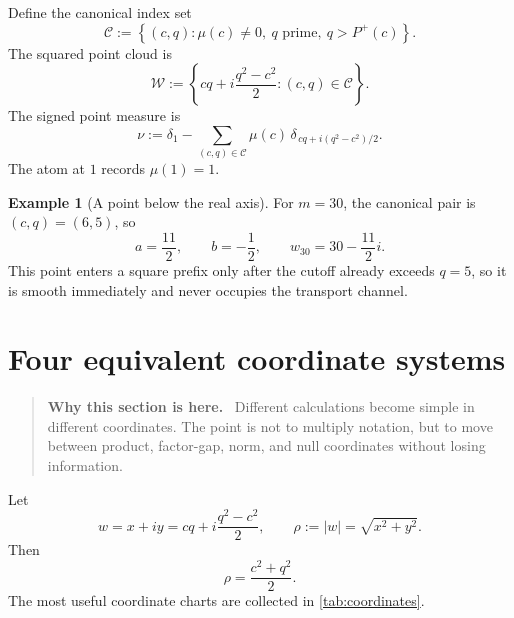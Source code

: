 \documentclass[11pt]{article}
\theoremstyle{definition}
\newtheorem{example}[theorem]{Example}
\theoremstyle{remark}
\newcommand{\Pplus}{P^{+}}
\newcommand{\1}{\mathbf{1}}
\newenvironment{motivation}
  {\begin{quote}\small\color{ovvogray}\textbf{Why this section is here.}\ }
  {\end{quote}}
\begin{document}
Define the canonical index set
\begin{equation}
 \mathscr C
 :=
 \left\{
 (c,q):
 \mu(c)\ne0,
 \ q\text{ prime},
 \ q>\Pplus(c)
 \right\}.
 \label{eq:canonical-index}
\end{equation}
The squared point cloud is
\begin{equation}
 \mathscr W
 :=
 \left\{
 cq+i\frac{q^2-c^2}{2}:(c,q)\in\mathscr C
 \right\}.
 \label{eq:canonical-cloud}
\end{equation}
The signed point measure is
\begin{equation}
 \nu
 :=
 \delta_1
 -
 \sum_{(c,q)\in\mathscr C}
 \mu(c)\,
 \delta_{\,cq+i(q^2-c^2)/2}.
 \label{eq:signed-measure}
\end{equation}
The atom at $1$ records $\mu(1)=1$.

\begin{example}[A point below the real axis]
For $m=30$, the canonical pair is $(c,q)=(6,5)$, so
\[
 a=\frac{11}{2},
 \qquad
 b=-\frac12,
 \qquad
 w_{30}=30-\frac{11}{2}i.
\]
This point enters a square prefix only after the cutoff already exceeds $q=5$, so it is smooth immediately and never occupies the transport channel.
\end{example}

\section{Four equivalent coordinate systems}
\label{sec:coordinates}

\begin{motivation}
Different calculations become simple in different coordinates.  The point is not to multiply notation, but to move between product, factor-gap, norm, and null coordinates without losing information.
\end{motivation}

Let
\begin{equation}
 w=x+iy
 =cq+i\frac{q^2-c^2}{2},
 \qquad
 \rho:=|w|=\sqrt{x^2+y^2}.
 \label{eq:w-rho}
\end{equation}
Then
\begin{equation}
 \rho=\frac{c^2+q^2}{2}.
 \label{eq:rho-cq}
\end{equation}
The most useful coordinate charts are collected in \cref{tab:coordinates}.
\end{document}
